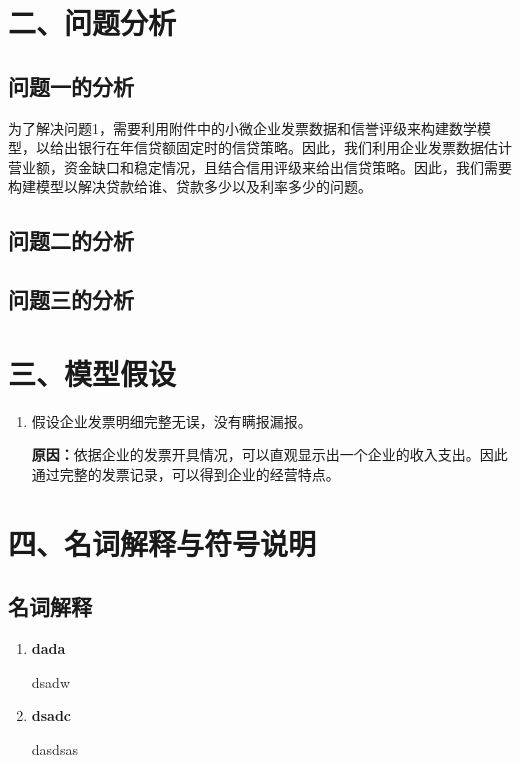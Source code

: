 \documentclass{my_paper}
\begin{document}
\section{二、问题分析}
\subsection{问题一的分析}

为了解决问题1，需要利用附件中的小微企业发票数据和信誉评级来构建数学模型，以给出银行在年信贷额固定时的信贷策略。因此，我们利用企业发票数据估计营业额，资金缺口和稳定情况，且结合信用评级来给出信贷策略。因此，我们需要构建模型以解决贷款给谁、贷款多少以及利率多少的问题。

\subsection{问题二的分析}


\subsection{问题三的分析}


\section{三、模型假设}
\begin{enumerate}
    \item 假设企业发票明细完整无误，没有瞒报漏报。
    
    \textbf{原因：}依据企业的发票开具情况，可以直观显示出一个企业的收入支出。因此通过完整的发票记录，可以得到企业的经营特点。


\end{enumerate}

\section{四、名词解释与符号说明}
\subsection{名词解释}
\begin{enumerate}
    \item \textbf{dada}
    
    dsadw
    
    \item \textbf{dsadc}
    
    dasdsas

    
\end{enumerate}
\end{document}

